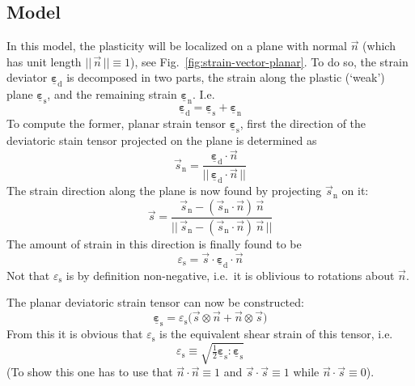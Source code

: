 \documentclass[times,namecite]{goose-article}
\newcommand\T[1]{\underline{\bm{{#1}}}}
\begin{document}
\subsection{Model}

In this model, the plasticity will be localized on a plane with normal $\vec{n}$ (which has unit length $||\, \vec{n} \,|| \equiv 1$), see Fig.~\ref{fig:strain-vector-planar}. To do so, the strain deviator $\T{\varepsilon}_\mathrm{d}$ is decomposed in two parts, the strain along the plastic (`weak') plane $\T{\varepsilon}_\mathrm{s}$, and the remaining strain $\T{\varepsilon}_\mathrm{n}$. I.e.
\begin{equation}\label{eq:planar:strain:decomposition}
  \T{\varepsilon}_\mathrm{d} = \T{\varepsilon}_\mathrm{s} + \T{\varepsilon}_\mathrm{n}
\end{equation}
To compute the former, planar strain tensor $\T{\varepsilon}_\mathrm{s}$, first the direction of the deviatoric stain tensor projected on the plane is determined as
\begin{equation}
  \vec{s}_\mathrm{n} =
  \frac{
    \T{\varepsilon}_\mathrm{d} \cdot \vec{n}
  }
  {
    ||\, \T{\varepsilon}_\mathrm{d} \cdot \vec{n} \,||
  }
\end{equation}
The strain direction along the plane is now found by projecting $\vec{s}_\mathrm{n}$ on it:
\begin{equation}
  \vec{s} =
  \frac{
    \vec{s}_\mathrm{n} - ( \vec{s}_\mathrm{n} \cdot \vec{n} )\, \vec{n}
  }
  {
    ||\, \vec{s}_\mathrm{n} - ( \vec{s}_\mathrm{n} \cdot \vec{n} )\, \vec{n} \,||
  }
\end{equation}
The amount of strain in this direction is finally found to be
\begin{equation}
  \varepsilon_\mathrm{s} = \vec{s} \cdot \T{\varepsilon}_\mathrm{d} \cdot \vec{n}
\end{equation}
Not that $\varepsilon_\mathrm{s}$ is by definition non-negative, i.e.\ it is oblivious to rotations about $\vec{n}$.

The planar deviatoric strain tensor can now be constructed:
\begin{equation}
  \T{\varepsilon}_\mathrm{s} = \varepsilon_\mathrm{s}
  \big(
    \vec{s} \otimes \vec{n} + \vec{n} \otimes \vec{s}
  \big)
\end{equation}
From this it is obvious that $\varepsilon_\mathrm{s}$ is the equivalent shear strain of this tensor, i.e.
\begin{equation}
  \varepsilon_\mathrm{s}
  \equiv
  \sqrt{ \tfrac{1}{2} \T{\varepsilon}_\mathrm{s} : \T{\varepsilon}_\mathrm{s} }
\end{equation}
(To show this one has to use that $\vec{n} \cdot \vec{n} \equiv 1$ and $\vec{s} \cdot \vec{s} \equiv 1$ while $\vec{n} \cdot \vec{s} \equiv 0$).
\end{document}
